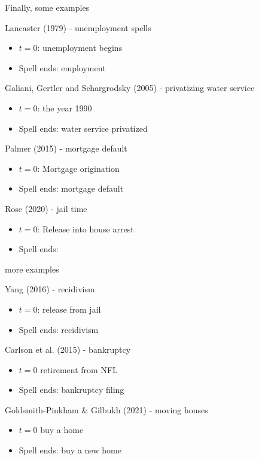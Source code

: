 \documentclass[notes,11pt, aspectratio=169]{beamer}
\newenvironment{wideitemize}{\itemize\addtolength{\itemsep}{10pt}}{\enditemize}
\begin{document}
\begin{frame}{Finally, some examples}
  \begin{wideitemize}
  \item Lancaster (1979) - unemployment spells
    \begin{itemize}
    \item $t=0$: unemployment begins
    \item Spell ends: employment
    \end{itemize}
  \item Galiani, Gertler and Schargrodsky (2005) - privatizing water service 
    \begin{itemize}
    \item $t=0$: the year 1990
    \item Spell ends: water service privatized      
    \end{itemize}
  \item Palmer (2015) - mortgage default
    \begin{itemize}
    \item $t = 0$: Mortgage origination
    \item Spell ends: mortgage default
    \end{itemize}
  \item Rose (2020) - jail time
    \begin{itemize}
    \item $t = 0$: Release into house arrest
    \item Spell ends:  
    \end{itemize}
  \end{wideitemize}
\end{frame}


\begin{frame}{more examples}
  \begin{wideitemize}
    \item Yang (2016) - recidivism
    \begin{itemize}
    \item $t=0$: release from jail
    \item Spell ends: recidivism
    \end{itemize}
  \item Carlson et al. (2015) - bankruptcy
    \begin{itemize}
    \item $t = 0$ retirement from NFL
    \item Spell ends: bankruptcy filing
    \end{itemize}
  \item Goldsmith-Pinkham \& Gilbukh (2021) - moving houses
    \begin{itemize}
    \item $t = 0$ buy a home
    \item Spell ends: buy a new home
    \end{itemize}
  \end{wideitemize}
\end{frame}
\end{document}
